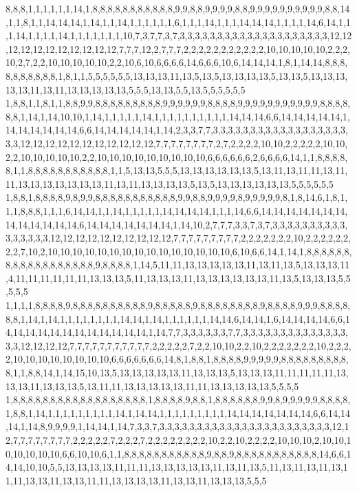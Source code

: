 8,8,8,1,1,1,1,1,1,14,1,8,8,8,8,8,8,8,8,8,8,8,9,9,8,8,9,9,9,9,8,8,9,9,9,9,9,9,9,9,9,9,8,8,14,1,1,8,1,1,14,14,14,1,14,1,1,14,1,1,1,1,1,1,6,1,1,1,14,1,1,1,14,14,14,1,1,1,1,14,6,14,1,1,1,14,1,1,1,1,14,1,1,1,1,1,1,1,10,7,3,7,7,3,7,3,3,3,3,3,3,3,3,3,3,3,3,3,3,3,3,3,3,3,3,12,12,12,12,12,12,12,12,12,12,12,7,7,7,12,2,7,7,7,2,2,2,2,2,2,2,2,2,2,2,10,10,10,10,10,2,2,2,10,2,7,2,2,10,10,10,10,10,2,2,10,6,10,6,6,6,6,14,6,6,6,10,6,14,14,14,1,8,1,14,14,8,8,8,8,8,8,8,8,8,8,1,8,1,1,5,5,5,5,5,5,13,13,13,11,13,5,13,5,13,13,13,13,5,13,13,5,13,13,13,13,13,11,13,11,13,13,13,13,13,5,5,5,13,13,5,5,13,5,5,5,5,5,5
1,8,8,1,1,8,1,1,8,8,9,9,8,8,8,8,8,8,8,8,8,9,9,9,9,9,9,8,8,8,8,9,9,9,9,9,9,9,9,9,9,9,8,8,8,8,8,8,1,14,1,14,10,10,1,14,1,1,1,1,1,14,1,1,1,1,1,1,1,1,1,1,14,14,14,6,6,14,14,14,14,14,1,14,14,14,14,14,14,6,6,14,14,14,14,14,1,14,2,3,3,7,7,3,3,3,3,3,3,3,3,3,3,3,3,3,3,3,3,3,3,3,3,12,12,12,12,12,12,12,12,12,12,12,7,7,7,7,7,7,7,7,2,7,2,2,2,2,10,10,2,2,2,2,2,10,10,2,2,10,10,10,10,10,2,2,10,10,10,10,10,10,10,10,10,6,6,6,6,6,6,2,6,6,6,6,14,1,1,8,8,8,8,8,1,1,8,8,8,8,8,8,8,8,8,8,8,1,1,5,13,13,5,5,5,13,13,13,13,13,13,5,13,11,13,11,11,13,11,11,13,13,13,13,13,13,13,11,13,11,13,13,13,13,5,13,5,13,13,13,13,13,13,5,5,5,5,5,5
1,8,8,1,8,8,8,8,9,8,9,9,8,8,8,8,8,8,8,8,8,8,8,9,9,8,8,9,9,9,9,8,9,9,9,9,9,8,1,8,14,6,1,8,1,1,1,8,8,8,1,1,1,6,14,14,1,1,14,1,1,1,1,1,14,14,14,14,1,1,1,14,6,6,14,14,14,14,14,14,14,14,14,14,14,14,14,6,14,14,14,14,14,14,14,1,14,10,2,7,7,7,3,3,7,3,7,3,3,3,3,3,3,3,3,3,3,3,3,3,3,3,3,12,12,12,12,12,12,12,12,12,12,7,7,7,7,7,7,7,7,7,2,2,2,2,2,2,2,10,2,2,2,2,2,2,2,2,7,10,2,10,10,10,10,10,10,10,10,10,10,10,10,10,10,10,6,10,6,6,14,1,14,1,8,8,8,8,8,8,8,8,8,8,8,8,8,8,8,8,8,8,9,8,8,8,8,1,14,5,11,11,13,13,13,13,13,11,13,11,13,5,13,13,13,11,4,11,11,11,11,11,11,13,13,13,5,11,13,13,13,11,13,13,13,13,13,13,11,13,5,13,13,13,5,5,5,5,5
1,1,1,1,8,8,8,8,9,8,8,8,8,8,8,8,8,8,8,9,8,8,8,8,8,9,8,8,8,8,8,8,8,8,9,8,8,8,8,9,9,9,8,8,8,8,8,8,1,14,1,14,1,1,1,1,1,1,1,1,14,14,1,14,1,1,1,1,1,1,14,14,6,14,14,1,6,14,14,14,14,6,6,14,14,14,14,14,14,14,14,14,14,14,14,1,14,7,7,3,3,3,3,3,3,7,7,3,3,3,3,3,3,3,3,3,3,3,3,3,3,3,3,12,12,12,12,7,7,7,7,7,7,7,7,7,7,7,2,2,2,2,2,7,2,2,10,10,2,2,10,2,2,2,2,2,2,2,10,2,2,2,2,10,10,10,10,10,10,10,10,6,6,6,6,6,6,6,14,8,1,8,8,1,8,8,8,8,9,9,9,9,9,8,8,8,8,8,8,8,8,8,8,1,1,8,8,14,1,14,15,10,13,5,13,13,13,13,13,11,13,13,13,5,13,13,13,11,11,11,11,11,13,13,13,11,13,13,13,5,13,11,11,13,13,13,13,13,11,11,13,13,13,13,13,5,5,5,5
1,8,8,8,8,8,8,8,8,8,8,8,8,8,8,8,8,8,8,1,8,8,8,8,9,8,8,1,8,8,8,8,8,8,9,9,8,9,9,9,9,9,8,8,8,8,1,8,8,1,14,1,1,1,1,1,1,1,1,1,14,1,14,14,1,1,1,1,1,1,1,1,1,14,14,14,14,14,14,14,6,6,14,14,14,1,14,8,9,9,9,9,1,14,14,1,14,7,3,3,7,3,3,3,3,3,3,3,3,3,3,3,3,3,3,3,3,3,3,3,3,3,3,3,12,12,7,7,7,7,7,7,7,7,2,2,2,2,2,7,2,2,2,7,2,2,2,2,2,2,2,2,10,2,2,10,2,2,2,2,10,10,10,2,10,10,10,10,10,10,10,6,6,10,10,6,1,1,8,8,8,8,8,8,8,8,8,8,8,9,8,8,9,8,8,8,8,8,8,8,8,8,8,8,14,6,6,14,14,10,10,5,5,13,13,13,13,11,11,11,13,13,13,13,13,11,13,11,13,5,11,13,11,13,11,13,11,11,13,13,11,13,13,11,11,13,13,13,13,11,13,13,11,13,13,13,5,5,5
